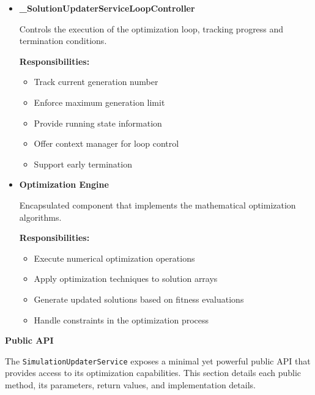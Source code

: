 \begin{itemize}
\item \textbf{\_SolutionUpdaterServiceLoopController}

Controls the execution of the optimization loop, tracking progress and termination conditions.

\textbf{Responsibilities:}
\begin{itemize}
	\item Track current generation number
	\item Enforce maximum generation limit
	\item Provide running state information
	\item Offer context manager for loop control
	\item Support early termination
\end{itemize}

\item \textbf{Optimization Engine}

Encapsulated component that implements the mathematical optimization algorithms.

\textbf{Responsibilities:}
\begin{itemize}
	\item Execute numerical optimization operations
	\item Apply optimization techniques to solution arrays
	\item Generate updated solutions based on fitness evaluations
	\item Handle constraints in the optimization process
\end{itemize}

\end{itemize}

\textbf{Public API}

The \texttt{SimulationUpdaterService} exposes a minimal yet powerful public API that provides access to its optimization capabilities. This section details each public method, its parameters, return values, and implementation details.

